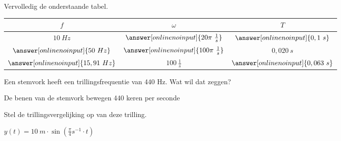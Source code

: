 \documentclass{ximera}
\begin{document}
\begin{exercise} 
		Vervolledig de onderstaande tabel. \ \\
		\begin{tabular}{|c|c|c|}
		    \hline
            $f$ & $\omega$ & $T$ \\ \hline
            $10 \ Hz$ & $\answer[onlinenoinput]{20\pi \ \frac{1}{s}}$ & $\answer[onlinenoinput]{0,1 \ s}$ \\ \hline
            $\answer[onlinenoinput]{50 \ Hz}$ & $\answer[onlinenoinput]{100\pi \ \frac{1}{s}}$ & $0,020 \ s$ \\ \hline
            $\answer[onlinenoinput]{15,91 \ Hz}$ & $100 \ \frac{1}{s}$ & $\answer[onlinenoinput]{0,063 \ s}$ \\ \hline
		\end{tabular}
\end{exercise}

\begin{exercise} 
Een stemvork heeft een trillingsfrequentie van 440 Hz. Wat wil dat zeggen?
    \begin{oplossing}
        De benen van de stemvork bewegen 440 keren per seconde
    \end{oplossing}
\end{exercise}

\begin{exercise} 
Stel de trillingsvergelijking op van deze trilling.
    \begin{image}[0.5\textwidth]
    \end{image}

    \begin{oplossing}
        $y(t)=10 \ m \cdot \sin \left(\frac{\pi}{4}s^{-1}\cdot t\right)$
    \end{oplossing}
\end{exercise}
\end{document}
